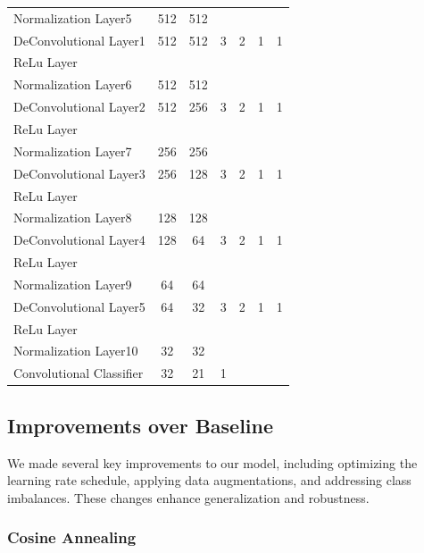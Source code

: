 \documentclass{article}
\begin{document}
\begin{table}[H]
\begin{tabular}{lcccccc}
    Normalization Layer5 & 512   & 512   &       &       &       &  \\
    DeConvolutional Layer1 & 512   & 512   & 3     & 2     & 1     & 1 \\
    ReLu Layer &       &       &       &       &       &  \\
    Normalization Layer6 & 512   & 512   &       &       &       &  \\
    DeConvolutional Layer2 & 512   & 256   & 3     & 2     & 1     & 1 \\
    ReLu Layer &       &       &       &       &       &  \\
    Normalization Layer7 & 256   & 256   &       &       &       &  \\
    DeConvolutional Layer3 & 256   & 128   & 3     & 2     & 1     & 1 \\
    ReLu Layer &       &       &       &       &       &  \\
    Normalization Layer8 & 128   & 128   &       &       &       &  \\
    DeConvolutional Layer4 & 128   & 64    & 3     & 2     & 1     & 1 \\
    ReLu Layer &       &       &       &       &       &  \\
    Normalization Layer9 & 64    & 64    &       &       &       &  \\
    DeConvolutional Layer5 & 64    & 32    & 3     & 2     & 1     & 1 \\
    ReLu Layer &       &       &       &       &       &  \\
    Normalization Layer10 & 32    & 32    &       &       &       &  \\
    Convolutional Classifier & 32    & 21    & 1     &       &       &  \\
    \bottomrule
    \end{tabular}%
  \label{tab:baseline}%
\end{table}%

\subsection{Improvements over Baseline}

We made several key improvements to our model, including optimizing the learning rate schedule, applying data augmentations, and addressing class imbalances. These changes enhance generalization and robustness.

\subsubsection{Cosine Annealing} 
\end{document}
